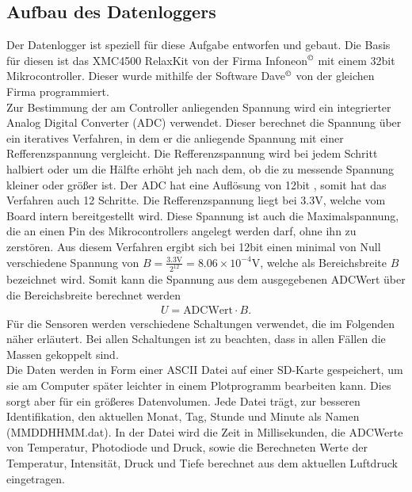 \documentclass[12pt,a4paper,titlepage,headinclude,bibtotoc]{scrartcl}
\begin{document}
\subsection{Aufbau des Datenloggers}
Der Datenlogger ist speziell für diese Aufgabe entworfen und gebaut.
Die Basis für diesen ist das XMC4500 RelaxKit von der Firma Infoneon$^\copyright$ mit einem 32bit Mikrocontroller.
Dieser wurde mithilfe der Software Dave$^\copyright$ von der gleichen Firma programmiert.\\
Zur Bestimmung der am Controller anliegenden Spannung wird ein integrierter Analog Digital Converter (ADC) verwendet.
Dieser berechnet die Spannung über ein iteratives Verfahren, in dem er die anliegende Spannung mit einer Refferenzspannung vergleicht.
Die Refferenzspannung wird bei jedem Schritt halbiert oder um die Hälfte erhöht jeh nach dem, ob die zu messende Spannung kleiner oder größer ist.
Der ADC hat eine Auflösung von 12bit %
, somit hat das Verfahren auch 12 Schritte.
Die Refferenzspannung liegt bei 3.3\si{\volt}, welche vom Board intern bereitgestellt wird.
Diese Spannung ist auch die Maximalspannung, die an einen Pin des Mikrocontrollers angelegt werden darf, ohne ihn zu zerstören.
Aus diesem Verfahren ergibt sich bei 12bit einen minimal von Null verschiedene Spannung von $B=\frac{3.3\si{\volt}}{2^{12}}=8.06\times10^{-4}\si{\volt}$, welche als Bereichsbreite $B$ bezeichnet wird.
Somit kann die Spannung aus dem ausgegebenen ADCWert über die Bereichsbreite berechnet werden
\begin{align}
	U=\text{ADCWert}\cdot B.\label{eq:ADCwert}
\end{align}
Für die Sensoren werden verschiedene Schaltungen verwendet, die im Folgenden näher erläutert.
Bei allen Schaltungen ist zu beachten, dass in allen Fällen die Massen gekoppelt sind.\\
Die Daten werden in Form einer ASCII Datei auf einer SD-Karte gespeichert, um sie am Computer später leichter in einem Plotprogramm bearbeiten kann.
Dies sorgt aber für ein größeres Datenvolumen.
Jede Datei trägt, zur besseren Identifikation, den aktuellen Monat, Tag, Stunde und Minute als Namen (MMDDHHMM.dat).
In der Datei wird die Zeit in Millisekunden, die ADCWerte von Temperatur, Photodiode und Druck, sowie die Berechneten Werte der Temperatur, Intensität, Druck und Tiefe berechnet aus dem aktuellen Luftdruck eingetragen.
\end{document}
